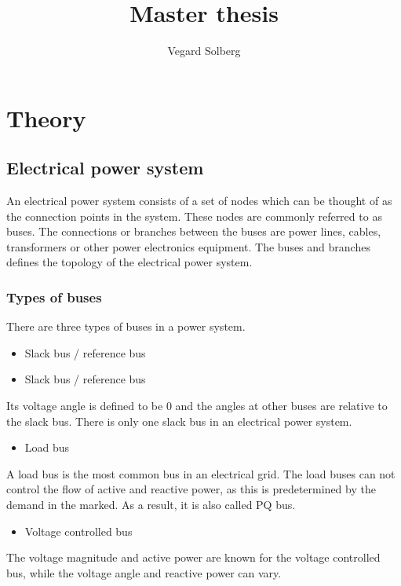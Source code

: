 \documentclass{book}
\begin{document}
\title{Master thesis}
\author{Vegard Solberg}
 
\maketitle
\tableofcontents


\chapter{Theory}
\section{Electrical power system}
An electrical power system consists of a set of nodes which can be thought of as the connection points in the system. These nodes are commonly referred to as buses. The connections or branches between the buses are power lines, cables, transformers or other power electronics equipment. The buses and branches defines the topology of the electrical power system. 


\subsection{Types of buses}
There are three types of buses in a power system\cite{opf_intro}.

\begin{itemize}
  \item Slack bus / reference bus
\end{itemize}



\begin{itemize}
  \item Slack bus / reference bus
\end{itemize}
Its voltage angle is defined to be 0 and the angles at other buses are relative to the slack bus. There is only one slack bus in an electrical power system.

\begin{itemize}
  \item Load bus
\end{itemize}
A load bus is the most common bus in an electrical grid. The load buses can not control the flow of active and reactive power, as this is predetermined by the demand in the marked. As a result, it is also called PQ bus.

\begin{itemize}
  \item Voltage controlled bus
\end{itemize}
The voltage magnitude and active power are known for the voltage controlled bus, while the voltage angle and reactive power can vary. 


\end{document}
